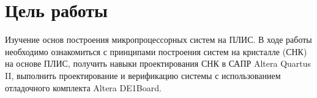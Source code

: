 \setcounter{page}{2}
\chapter*{\textbf{Цель работы}}
Изучение основ построения микропроцессорных систем на ПЛИС. В ходе работы необходимо ознакомиться с принципами построения систем на кристалле (СНК) на основе ПЛИС, получить навыки проектирования СНК в САПР Altera Quartus II, выполнить проектирование и верификацию системы с использованием отладочного комплекта Altera DE1Board.


